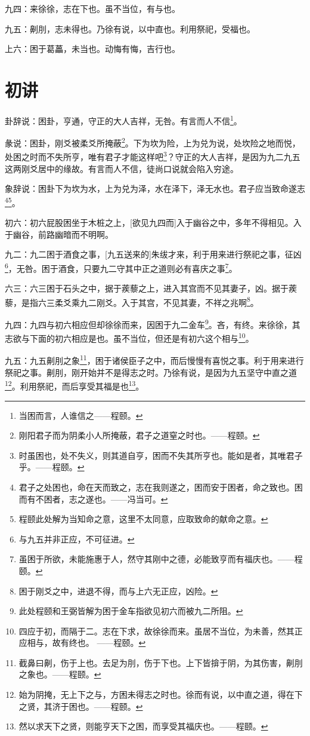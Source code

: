 \documentclass[12pt,oneside]{book}
\begin{document}
九四：来徐徐，志在下也。虽不当位，有与也。

九五：劓刖，志未得也。乃徐有说，以中直也。利用祭祀，受福也。

上六：困于葛藟，未当也。动悔有悔，吉行也。

\section{初讲}
卦辞说：困卦，亨通，守正的大人吉祥，无咎。有言而人不信\footnote{当困而言，人谁信之——程颐。}。

彖说：困卦，刚爻被柔爻所掩蔽\footnote{刚阳君子而为阴柔小人所掩蔽，君子之道窒之时也。——程颐。}。下为坎为险，上为兑为说，处坎险之地而悦，处困之时而不失所亨，唯有君子才能这样吧\footnote{时虽困也，处不失义，则其道自亨，困而不失其所亨也。能如是者，其唯君子乎。——程颐。}？守正的大人吉祥，是因为九二九五这两刚爻居中的缘故。有言而人不信，徒尚口说就会陷入穷途。

象辞说：困卦下为坎为水，上为兑为泽，水在泽下，泽无水也。君子应当致命遂志\footnote{君子之处困也，命在天而致之，志在我则遂之，困而安于困者，命之致也。困而有不困者，志之遂也。——冯当可。}\footnote{程颐此处解为当知命之意，这里不太同意，应取致命的献命之意。}。


初六：初六屁股困坐于木桩之上，[欲见九四而]入于幽谷之中，多年不得相见。入于幽谷，前路幽暗而不明啊。

九二：九二困于酒食之事，[九五送来的]朱绂才来，利于用来进行祭祀之事，征凶\footnote{与九五并非正应，不可征进。}，无咎。困于酒食，只要九二守其中正之道则必有喜庆之事\footnote{虽困于所欲，未能施惠于人，然守其刚中之德，必能致亨而有福庆也。——程颐。}。

六三：六三困于石头之中，据于蒺藜之上，进入其宫而不见其妻子，凶。据于蒺藜，是指六三柔爻乘九二刚爻。入于其宫，不见其妻，不祥之兆啊\footnote{困于刚爻之中，进退不得，而与上六无正应，凶险。}。

九四：九四与初六相应但却徐徐而来，因困于九二金车\footnote{此处程颐和王弼皆解为困于金车指欲见初六而被九二所阻。}。吝，有终。来徐徐，其志欲与下面的初六相应是也。虽不当位，但还是有初六这个相与\footnote{四应于初，而隔于二。志在下求，故徐徐而来。虽居不当位，为未善，然其正应相与，故有终也。 ——程颐。}。

九五：九五劓刖之象\footnote{截鼻曰劓，伤于上也。去足为刖，伤于下也。上下皆揜于阴，为其伤害，劓刖之象也。——程颐。}，困于诸侯臣子之中，而后慢慢有喜悦之事。利于用来进行祭祀之事。劓刖，刚开始并不是得志之时。乃徐有说，是因为九五坚守中直之道\footnote{始为阴掩，无上下之与，方困未得志之时也。徐而有说，以中直之道，得在下之贤，其济于困也。——程颐。}。利用祭祀，而后享受其福是也\footnote{然以求天下之贤，则能亨天下之困，而享受其福庆也。——程颐。}。
\end{document}
